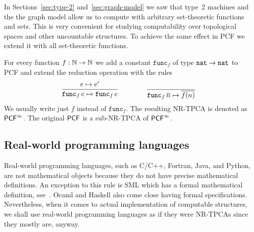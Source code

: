 In Sections~\ref{sec:type-2} and~\ref{sec:graph-model} we saw that
type~2 machines and the the graph model allow us to compute with
arbitrary set-theoretic functions and sets. This is very convenient
for studying computability over topological spaces and other
uncountable structures. To achieve the same effect in PCF we extend it
with all set-theoretic functions.

For every function $f : \mathbb{N} \to \mathbb{N}$ we add a constant
$\mathtt{func}_f$ of type $\mathtt{nat} \to \mathtt{nat}$ to PCF and extend the
reduction operation with the rules
%
\begin{equation*}
  \begin{gathered}\dfrac{e \mapsto e'}{\mathtt{func}_f\,e \mapsto \mathtt{func}_f\,e}\end{gathered}
  \qquad\qquad
  \dfrac{}{\mathtt{func}_f\,\overline{n} \mapsto \overline{f(n)}}
\end{equation*}
%
We usually write just $f$ instead of $\mathtt{func}_f$. The resulting
NR-TPCA is denoted as $\mathsf{PCF}^\infty$. The original $\mathsf{PCF}$ is a sub-NR-TPCA
of $\mathsf{PCF}^\infty$.


\subsection{Real-world programming languages}
\label{sec:programming-languages}

Real-world programming languages, such as C/C++, Fortran, Java, and
Python, are not mathematical objects because they do not have precise
mathematical definitions. An exception to this rule is SML which has a
formal mathematical definition, see~\cite{MilnerR:defsml}. Ocaml and
Haskell also come close having formal specifications. Nevertheless,
when it comes to actual implementation of computable structures, we
shall use real-world programming languages as if they were NR-TPCAs
since they mostly are, anyway.


